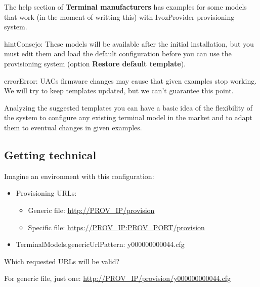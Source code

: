 \documentclass[letterpaper,10pt,spanish]{sphinxmanual}
\begin{document}
The help section of \textbf{Terminal manufacturers} has examples for some models
that work (in the moment of writting this) with IvozProvider provisioning system.

\begin{notice}{hint}{Consejo:}
These models will be available after the initial installation, but
you must edit them and load the default configuration before
you can use the provisioning system (option \textbf{Restore default template}).
\end{notice}

\begin{notice}{error}{Error:}
UACs firmware changes may cause that given examples stop working. We
will try to keep templates updated, but we can't guarantee this point.
\end{notice}

Analyzing the suggested templates you can have a basic idea of the flexibility of
the system to configure any existing terminal model in the market and to adapt
them to eventual changes in given examples.


\subsection{Getting technical}
\label{administration_portal/platform/terminal_manufacturers:getting-technical}
Imagine an environment with this configuration:
\begin{itemize}
\item {} 
Provisioning URLs:
\begin{itemize}
\item {} 
Generic file: \url{http://PROV\_IP/provision}

\item {} 
Specific file: \url{https://PROV\_IP:PROV\_PORT/provision}

\end{itemize}

\item {} 
TerminalModels.genericUrlPattern: y000000000044.cfg

\end{itemize}

Which requested URLs will be valid?

For generic file, just one: \url{http://PROV\_IP/provision/y000000000044.cfg}
\end{document}
